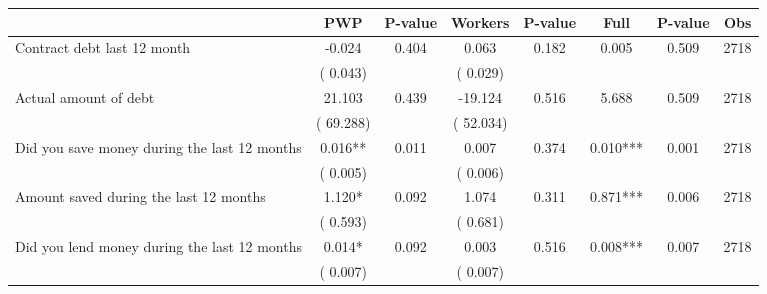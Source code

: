 
\begin{tabular}{l*{7}{c}}\hline&\multicolumn{1}{c}{PWP}&\multicolumn{1}{c}{P-value}&\multicolumn{1}{c}{Workers}&\multicolumn{1}{c}{P-value}&\multicolumn{1}{c}{Full}&\multicolumn{1}{c}{P-value}&\multicolumn{1}{c}{Obs} \\ \hline

 Contract debt last 12 month       &             -0.024       &        0.404  &              0.063       &        0.182  &              0.005       &              0.509 &  2718 \\ 
                       &       (       0.043)             &                               &       (       0.029)                     &                               &                                               &                                &                      \\ 

 Actual amount of debt       &             21.103       &        0.439  &            -19.124       &        0.516  &              5.688       &              0.509 &  2718 \\ 
                       &       (      69.288)             &                               &       (      52.034)                     &                               &                                               &                                &                      \\ 

 Did you save money during the last 12 months       &              0.016**       &        0.011  &              0.007       &        0.374  &              0.010***       &              0.001 &  2718 \\ 
                       &       (       0.005)             &                               &       (       0.006)                     &                               &                                               &                                &                      \\ 

 Amount saved during the last 12 months       &              1.120*       &        0.092  &              1.074       &        0.311  &              0.871***       &              0.006 &  2718 \\ 
                       &       (       0.593)             &                               &       (       0.681)                     &                               &                                               &                                &                      \\ 

 Did you lend money during the last 12 months       &              0.014*       &        0.092  &              0.003       &        0.516  &              0.008***       &              0.007 &  2718 \\ 
                       &       (       0.007)             &                               &       (       0.007)                     &                               &                                               &                                &                      \\ 

\hline \end{tabular}